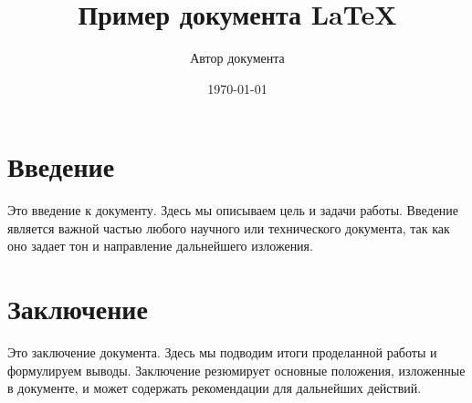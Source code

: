 \documentclass{article}
\title{Пример документа LaTeX}
\author{Автор документа}
\date{\today}
\begin{document}
\maketitle

\section{Введение}
Это введение к документу. Здесь мы описываем цель и задачи работы. Введение является важной частью любого научного или технического документа, так как оно задает тон и направление дальнейшего изложения.

\section{Заключение}
Это заключение документа. Здесь мы подводим итоги проделанной работы и формулируем выводы. Заключение резюмирует основные положения, изложенные в документе, и может содержать рекомендации для дальнейших действий.
\end{document}

